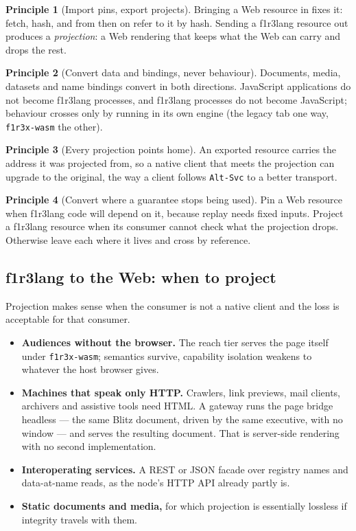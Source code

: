 \documentclass[11pt]{article}
\theoremstyle{definition}
\newtheorem{principle}{Principle}
\theoremstyle{remark}
\newcommand{\fl}{f1r3lang}
\newcommand{\code}[1]{\texttt{#1}}
\begin{document}
\begin{principle}[Import pins, export projects]
Bringing a Web resource in fixes it: fetch, hash, and from then on refer to it by hash.
Sending a \fl{} resource out produces a \emph{projection}: a Web rendering that keeps
what the Web can carry and drops the rest.
\end{principle}

\begin{principle}[Convert data and bindings, never behaviour]
Documents, media, datasets and name bindings convert in both directions. JavaScript
applications do not become \fl{} processes, and \fl{} processes do not become
JavaScript; behaviour crosses only by running in its own engine (the legacy tab one
way, \code{f1r3x-wasm} the other).
\end{principle}

\begin{principle}[Every projection points home]
An exported resource carries the address it was projected from, so a native client that
meets the projection can upgrade to the original, the way a client follows
\code{Alt-Svc} to a better transport.
\end{principle}

\begin{principle}[Convert where a guarantee stops being used]
Pin a Web resource when \fl{} code will depend on it, because replay needs fixed
inputs. Project a \fl{} resource when its consumer cannot check what the projection
drops. Otherwise leave each where it lives and cross by reference.
\end{principle}

\subsection{\fl{} to the Web: when to project}

Projection makes sense when the consumer is not a native client and the loss is
acceptable for that consumer.

\begin{itemize}[nosep]
\item \textbf{Audiences without the browser.} The reach tier serves the page itself
  under \code{f1r3x-wasm}; semantics survive, capability isolation weakens to whatever
  the host browser gives.
\item \textbf{Machines that speak only HTTP.} Crawlers, link previews, mail clients,
  archivers and assistive tools need HTML. A gateway runs the page bridge headless ---
  the same Blitz document, driven by the same executive, with no window --- and serves
  the resulting document. That is server-side rendering with no second implementation.
\item \textbf{Interoperating services.} A REST or JSON facade over registry names and
  data-at-name reads, as the node's HTTP API already partly is.
\item \textbf{Static documents and media,} for which projection is essentially lossless
  if integrity travels with them.
\end{itemize}
\end{document}
